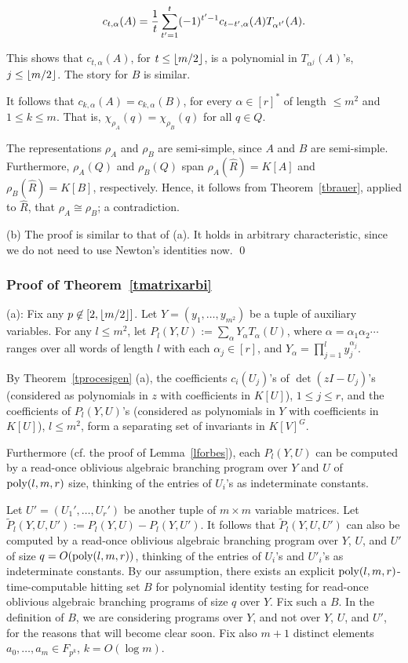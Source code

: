 \documentclass[11pt]{article}
\begin{document}
\[ c_{t,\alpha}(A) =  {\frac {1} {t}} \sum_{t'=1}^{t} (-1)^{t'-1}  c_{t-t',\alpha}(A) 
T_{\alpha^{t'}}(A).\]

This shows that $c_{t,\alpha}(A)$, for $t \le {\lfloor m/2 \rfloor}$,  is a polynomial in 
$T_{\alpha^j}(A)$'s, $j\le {\lfloor m/2 \rfloor}$. 
The story for $B$ is similar.

It follows  that 
$c_{k,\alpha}(A)=c_{k,\alpha}(B)$, for every $\alpha \in [r]^*$ of length $\le m^2$
and  $1 \le k \le m$. That is, 
$\chi_{\rho_A}(q)=\chi_{\rho_B}(q)$ for all $q \in Q$.

The representations $\rho_A$ and $\rho_B$ are semi-simple, since $A$ and $B$ are semi-simple.
Furthermore,  $\rho_A(Q)$ and $\rho_B(Q)$  span $\rho_A(\hat R)=K[A]$ and $\rho_B(\hat R)=K[B]$, respectively.
Hence, it follows from Theorem~\ref{tbrauer},  applied to $\hat R$, 
that $\rho_A\cong \rho_B$; a contradiction. 

\noindent (b) The proof is similar to that of (a). It holds in arbitrary characteristic,
 since we do not need to use Newton's 
identities now. 
\qed 


\subsubsection{Proof of Theorem~\ref{tmatrixarbi}}

\noindent (a):  Fix any  $p \not \in [2,{\lfloor m/2 \rfloor}]$. 
Let  $Y=(y_1,\ldots,y_{m^2})$ be a tuple of 
auxiliary variables. For any $l \le m^2$,  let
$P_l(Y,U) := \sum_\alpha Y_\alpha T_\alpha(U)$, 
where $\alpha=\alpha_1 \alpha_2 \cdots$ 
ranges over  all words of length $l$ with each $\alpha_j \in [r]$, 
and $Y_\alpha=\prod_{j=1}^l y_j^{\alpha_j}$. 


By Theorem~\ref{tprocesigen} (a),
the coefficients $c_i(U_j)$'s of $\det(z I - U_j)$'s (considered as
polynomials in $z$ with coefficients in $K[U]$),  $1 \le j \le r$,
and the coefficients of $P_l(Y,U)$'s (considered as  polynomials in $Y$ with coefficients in $K[U]$), $l \le m^2$,  form
a separating set of invariants in $K[V]^G$.

Furthermore (cf. the proof of Lemma~\ref{lforbes}), each
$P_l(Y,U)$ can be
computed by a read-once oblivious algebraic branching program over $Y$ and $U$ of ${\mbox {poly}}(l,m,r)$ size, thinking of the entries
of $U_i$'s as indeterminate constants.

Let $U'=(U_1', \ldots,U_r')$ be another tuple of $m\times m$ variable matrices.
Let $\tilde P_l(Y,U,U'):= P_l(Y,U) - P_l(Y,U')$. 
It follows that $\tilde P_l(Y,U,U')$ can also be
computed by a read-once oblivious algebraic branching program over $Y$, $U$, and $U'$ of 
size $q=O({\mbox {poly}}(l,m,r))$, thinking of the entries
of $U_i$'s and $U'_i$'s as indeterminate constants. By our assumption, there exists an
explicit ${\mbox {poly}}(l,m,r)$-time-computable hitting set $B$ for
polynomial identity testing for read-once oblivious algebraic branching programs of size $q$ over $Y$. Fix such a $B$. In the definition of $B$,  we are 
considering programs over $Y$, and not over $Y$, $U$, and $U'$, for
the reasons that will become clear soon.
Fix also  $m+1$ distinct elements $a_0,\ldots,a_m \in F_{p^k}$, $k=O(\log m)$. 
\end{document}
